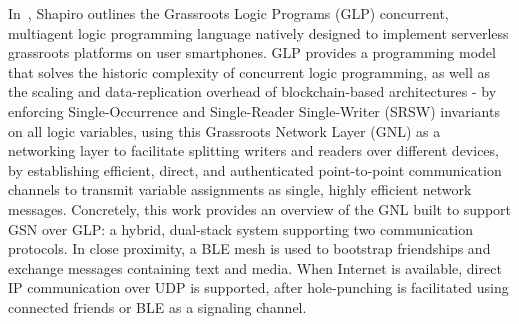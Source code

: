 In~\cite{Shapiro2026GLP}, Shapiro outlines the Grassroots Logic Programs (GLP) concurrent, multiagent logic programming language natively designed to implement serverless grassroots platforms on user smartphones. GLP provides a programming model that solves the historic complexity of concurrent logic programming, as well as the scaling and data-replication overhead of blockchain-based architectures - by enforcing Single-Occurrence and Single-Reader Single-Writer (SRSW) invariants on all logic variables, using this Grassroots Network Layer (GNL) as a networking layer to facilitate splitting writers and readers over different devices, by establishing efficient, direct, and authenticated point-to-point communication channels to transmit variable assignments as single, highly efficient network messages.
Concretely, this work provides an overview of the GNL built to support GSN over GLP: a hybrid, dual-stack system supporting two communication protocols. In close proximity, a BLE mesh is used to bootstrap friendships and exchange messages containing text and media. When Internet is available, direct IP communication over UDP is supported, after hole-punching is facilitated using connected friends or BLE as a signaling channel.